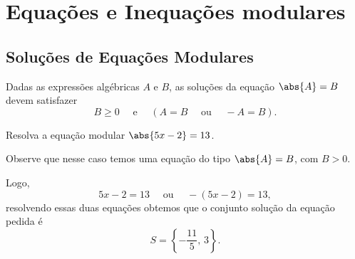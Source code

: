 \section{Equações e Inequações modulares}

\subsection{Soluções de Equações Modulares}

Dadas as expressões algébricas $A$ e $B$, as
soluções da equação $\abs{A}=B$ devem satisfazer
\[
  B \geq 0
  \quad\text{ e }\quad
  \left(
    A = B
    \quad\text{ ou }\quad
   -A = B
  \right).
\]

\begin{example}
  Resolva a equação modular
  \(\abs{5x-2} = 13\).

  \solution
  Observe que nesse caso temos uma equação do tipo $\abs{A}=B$, com $B>0$.

  Logo,
  \[
    5x-2 = 13
    \quad\text{ ou }\quad
    -(5x-2)=13,
  \]
  resolvendo essas duas equações obtemos que o conjunto solução da
  equação pedida é
  \[
    S = \left\{-\frac{11}{5},\, 3 \right\}.
  \]
\end{example}


